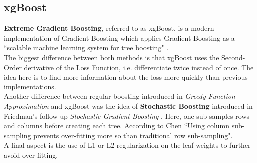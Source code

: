 \documentclass[11pt,a4paper]{report}
\begin{document}
\subsection{xgBoost}
\textbf{Extreme Gradient Boosting}, referred to as xgBoost, \cite{xgboost} is a modern implementation of Gradient Boosting which applies Gradient Boosting as a ``scalable machine learning system for tree boosting" \cite{xgboost}.
\medskip\\
The biggest difference between both methods is that xgBoost uses the \underline{Second-Order} derivative of the Loss Function, i.e. differentiate twice instead of once.
The idea here is to find more information about the loss more quickly than previous implementations.
\medskip\\
Another difference between regular boosting introduced in \textit{Greedy Function Approximation} \cite{gbm} and xgBoost was the idea of \textbf{Stochastic Boosting} introduced in Friedman's follow up \textit{Stochastic Gradient Boosting} \cite{stochasticgb}.
Here, one sub-samples rows and columns before creating each tree. 
According to Chen ``Using column sub-sampling prevents over-fitting more so than traditional row sub-sampling". 
\medskip\\
A final aspect is the use of L1 or L2 regularization on the leaf weights to further avoid over-fitting.
\end{document}
